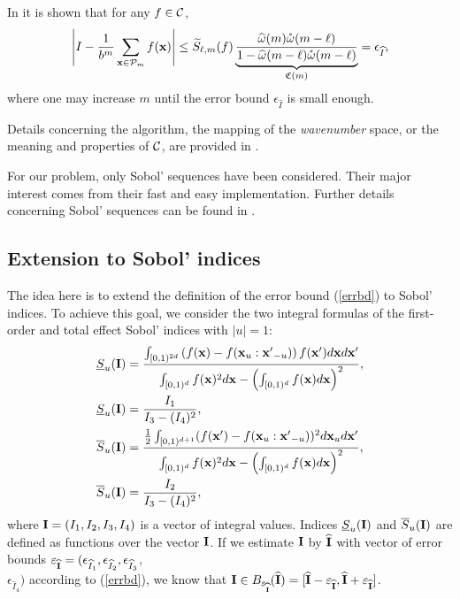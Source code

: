 In \cite[Sec. 4.2]{HicJim} it is shown that for any $f\in\mathcal{C}$,
\begin{equation}
\left\lvert I - \frac{1}{b^m}\sum_{\boldsymbol{\mathbf{x}}\in\mathcal{P}_m}f(\boldsymbol{\mathbf{x}})\right\rvert
\le \widetilde{S}_{\ell,m}(f)\underbrace{\frac{\widehat{\omega}(m) \mathring{\omega}(m-\ell)}{1 - \widehat{\omega}(m-\ell) \mathring{\omega}(m-\ell)}}_{\mathfrak{C}(m)}=\epsilon_{\widehat{I}}, \label{errbd}
\end{equation}
where one may increase $m$ until the error bound $\epsilon_{\widehat{I}}$ is small enough.

Details concerning the algorithm, the mapping of the \emph{wavenumber} space, or the meaning and properties of $\mathcal{C}$, are provided in \cite{HicJim}. 

For our problem, only Sobol' sequences \cite{Sobol'seq} have been considered. Their major interest comes from their fast and easy implementation. Further details concerning Sobol' sequences can be found in \cite{Lemieuxbook,Niederreiter}.

\subsection{Extension to Sobol' indices}
\label{sec:3.2}
The idea here is to extend the definition of the error bound (\ref{errbd}) to Sobol' indices. To achieve this goal, we consider the two integral formulas of the first-order and total effect Sobol' indices with $|u|=1$:
\begin{align*}
\underline{S}_u(\boldsymbol{\mathbf{I}}) & = \frac{\int_{[0,1)^{2d}} \left(f(\boldsymbol{\mathbf{x}})-
f(\boldsymbol{\mathbf{x}}_u:{\boldsymbol{\mathbf{x}}'}_{-u})\right)f(\boldsymbol{\mathbf{x}}')d\boldsymbol{\mathbf{x}} d{\boldsymbol{\mathbf{x}}'}}{\int_{[0,1)^{d}} f(\boldsymbol{\mathbf{x}})^2 d{\boldsymbol{\mathbf{x}}}-\left(\int_{[0,1)^{d}} f(\boldsymbol{\mathbf{x}}) d{\boldsymbol{\mathbf{x}}}\right)^2}, \\ 
\underline{S}_u(\boldsymbol{\mathbf{I}}) & = \frac{I_1}{I_3-(I_4)^2}, \\
\overline{S}_u(\boldsymbol{\mathbf{I}}) & = \frac{\frac{1}{2}\int_{[0,1)^{d+1}}(f(\boldsymbol{\mathbf{x}}')-f(\boldsymbol{\mathbf{x}}_u:{\boldsymbol{\mathbf{x}}'}_{-u}))^2d\boldsymbol{\mathbf{x}}_u d{\boldsymbol{\mathbf{x}}'}}{\int_{[0,1)^{d}} f(\boldsymbol{\mathbf{x}})^2 d{\boldsymbol{\mathbf{x}}}-\left(\int_{[0,1)^{d}} f(\boldsymbol{\mathbf{x}}) d{\boldsymbol{\mathbf{x}}}\right)^2}, \\
\overline{S}_u(\boldsymbol{\mathbf{I}}) & = \frac{I_2}{I_3-(I_4)^2},
\end{align*}
where $\boldsymbol{\mathbf{I}}=(I_1,I_2,I_3,I_4)$ is a vector of integral values. Indices $\underline{S}_u(\boldsymbol{\mathbf{I}})$ and $\overline{S}_u(\boldsymbol{\mathbf{I}})$ are defined as functions over the vector $\boldsymbol{\mathbf{I}}$. If we estimate $\boldsymbol{\mathbf{I}}$ by $\widehat{\boldsymbol{\mathbf{I}}}$ with vector of error bounds $\varepsilon_{\widehat{\boldsymbol{\mathbf{I}}}}=(\epsilon_{\widehat{I}_1},\epsilon_{\widehat{I}_2},\epsilon_{\widehat{I}_3}$,\\ $\epsilon_{\widehat{I}_4})$ according to (\ref{errbd}), we know that $\boldsymbol{\mathbf{I}}\in B_{\varepsilon_{\widehat{\boldsymbol{\mathbf{I}}}}}(\widehat{\boldsymbol{\mathbf{I}}})=[\widehat{\boldsymbol{\mathbf{I}}}-\varepsilon_{\widehat{\boldsymbol{\mathbf{I}}}},\widehat{\boldsymbol{\mathbf{I}}}+\varepsilon_{\widehat{\boldsymbol{\mathbf{I}}}} ]$. 

